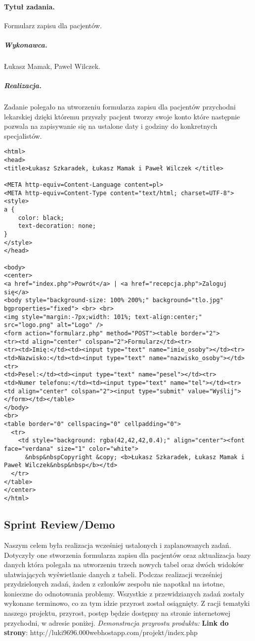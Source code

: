 \documentclass[a4paper]{article} \usepackage{polski} \usepackage[cp1250]{inputenc} \usepackage{url}
\begin{document}
\paragraph{Tytuł zadania.} Formularz zapisu dla pacjentów.  \subparagraph{Wykonawca.} Łukasz Mamak, Paweł Wilczek. \subparagraph{Realizacja.}
Zadanie polegało na utworzeniu formularza zapisu dla pacjentów  przychodni lekarskiej dzięki któremu przyszły pacjent tworzy swoje konto które następnie pozwala na zapisywanie się na ustalone daty i godziny do konkretnych specjalistów.

 \begin{verbatim}
<html>
<head>
<title>Łukasz Szkaradek, Łukasz Mamak i Paweł Wilczek </title>

<META http-equiv=Content-Language content=pl>
<META http-equiv=Content-Type content="text/html; charset=UTF-8">
<style>
a {
    color: black;
    text-decoration: none;
}
</style>
</head>

<body>
<center>
<a href="index.php">Powrót</a> | <a href="recepcja.php">Zaloguj się</a>
<body style="background-size: 100% 200%;" background="tlo.jpg" bgproperties="fixed"> <br> <br>
<img style="margin:-7px;width: 101%; text-align:center;" src="logo.png" alt="Logo" />
<form action="formularz.php" method="POST"><table border="2">
<tr><td align="center" colspan="2">Formularz</td><tr>
<tr><td>Imię:</td><td><input type="text" name="imie_osoby"></td><tr>
<td>Nazwisko:</td><td><input type="text" name="nazwisko_osoby"></td><tr>
<td>Pesel:</td><td><input type="text" name="pesel"></td><tr>
<td>Numer telefonu:</td><td><input type="text" name="tel"></td><tr>
<td align="center" colspan="2"><input type="submit" value="Wyślij"> </form></td></table>
</body>
<br>
<table border="0" cellspacing="0" cellpadding="0">
  <tr> 
    <td style="background: rgba(42,42,42,0.4);" align="center"><font face="verdana" size="1" color="white">
      &nbsp&nbspCopyright &copy; <b>Łukasz Szkaradek, Łukasz Mamak i Paweł Wilczek&nbsp&nbsp</b></td>
  </tr>
</table>
</center>
</html> 
\end{verbatim}


\subsection{Sprint Review/Demo}\label{Sprint2demo}
Naszym celem była realizacja wcześniej ustalonych i zaplanowanych zadań. Dotyczyły one stworzenia formularza zapisu dla pacjentów oraz aktualizacja bazy danych która polegała na utworzeniu trzech nowych tabel oraz dwóch widoków ułatwiających wyświetlanie danych z tabeli.   Podczas realizacji wcześniej przydzielonych zadań, żaden z członków zespołu nie napotkał na istotne, konieczne do odnotowania problemy. Wszystkie z przewidzianych zadań zostały wykonane terminowo, co za tym idzie przyrost  został osiągnięty.  Z racji tematyki naszego projektu, przyrost, postęp będzie dostępny na stronie internetowej przychodni, w adresie poniżej.\newline
\newline
\textit{Demonstracja przyrostu produktu:}\newline
\newline
\textbf{Link do strony}: http://luki9696.000webhostapp.com/projekt/index.php
\end{document}
